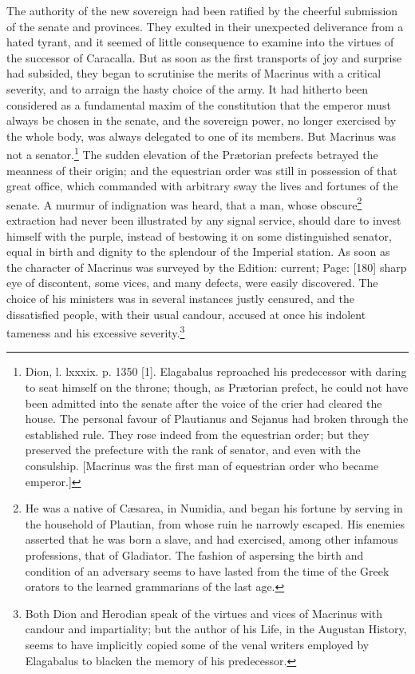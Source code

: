 The authority of the new sovereign had been ratified by the cheerful submission of the senate and provinces. They exulted in their unexpected deliverance from a hated tyrant, and it seemed of little consequence to examine into the virtues of the successor of Caracalla. But as soon as the first transports of joy and surprise had subsided, they began to scrutinise the merits of Macrinus with a critical severity, and to arraign the hasty choice of the army. It had hitherto been considered as a fundamental maxim of the constitution that the emperor must always be chosen in the senate, and the sovereign power, no longer exercised by the whole body, was always delegated to one of its members. But Macrinus was not a senator.\footnote{Dion, l. lxxxix. p. 1350 [1]. Elagabalus reproached his predecessor with daring to seat himself on the throne; though, as Prætorian prefect, he could not have been admitted into the senate after the voice of the crier had cleared the house. The personal favour of Plautianus and Sejanus had broken through the established rule. They rose indeed from the equestrian order; but they preserved the prefecture with the rank of senator, and even with the consulship. [Macrinus was the first man of equestrian order who became emperor.]} The sudden elevation of the Prætorian prefects betrayed the meanness of their origin; and the equestrian order was still in possession of that great office, which commanded with arbitrary sway the lives and fortunes of the senate. A murmur of indignation was heard, that a man, whose obscure\footnote{He was a native of Cæsarea, in Numidia, and began his fortune by serving in the household of Plautian, from whose ruin he narrowly escaped. His enemies asserted that he was born a slave, and had exercised, among other infamous professions, that of Gladiator. The fashion of aspersing the birth and condition of an adversary seems to have lasted from the time of the Greek orators to the learned grammarians of the last age.} extraction had never been illustrated by any signal service, should dare to invest himself with the purple, instead of bestowing it on some distinguished senator, equal in birth and dignity to the splendour of the Imperial station. As soon as the character of Macrinus was surveyed by the Edition: current; Page: [180] sharp eye of discontent, some vices, and many defects, were easily discovered. The choice of his ministers was in several instances justly censured, and the dissatisfied people, with their usual candour, accused at once his indolent tameness and his excessive severity.\footnote{Both Dion and Herodian speak of the virtues and vices of Macrinus with candour and impartiality; but the author of his Life, in the Augustan History, seems to have implicitly copied some of the venal writers employed by Elagabalus to blacken the memory of his predecessor.}

